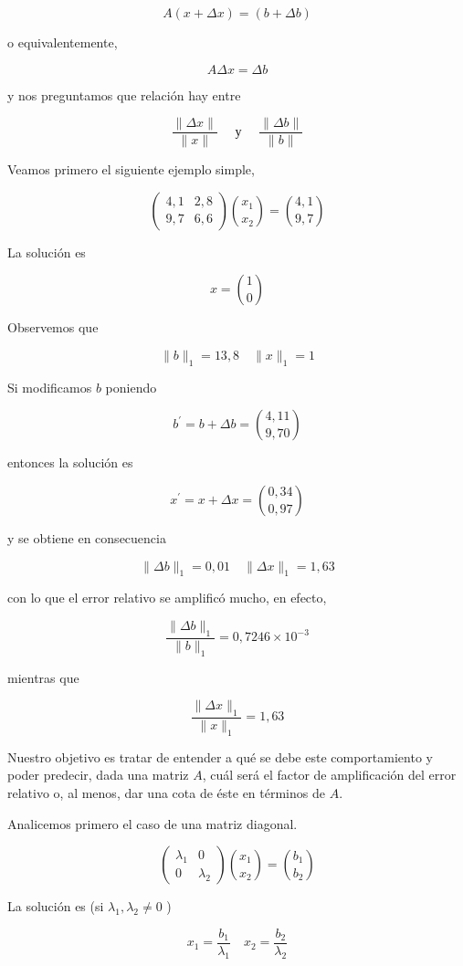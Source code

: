 \documentclass[10pt]{book}
\begin{document}
$$
A(x+\Delta x)=(b+\Delta b)
$$

o equivalentemente,

$$
A \Delta x=\Delta b
$$

y nos preguntamos que relación hay entre

$$
\frac{\|\Delta x\|}{\|x\|} \quad \text { у } \quad \frac{\|\Delta b\|}{\|b\|}
$$

Veamos primero el siguiente ejemplo simple,

$$
\left(\begin{array}{cc}
4,1 & 2,8 \\
9,7 & 6,6
\end{array}\right)\binom{x_{1}}{x_{2}}=\binom{4,1}{9,7}
$$

La solución es

$$
x=\binom{1}{0}
$$

Observemos que

$$
\|b\|_{1}=13,8 \quad\|x\|_{1}=1
$$

Si modificamos $b$ poniendo

$$
b^{\prime}=b+\Delta b=\binom{4,11}{9,70}
$$

entonces la solución es

$$
x^{\prime}=x+\Delta x=\binom{0,34}{0,97}
$$

y se obtiene en consecuencia

$$
\|\Delta b\|_{1}=0,01 \quad\|\Delta x\|_{1}=1,63
$$

con lo que el error relativo se amplificó mucho, en efecto,

$$
\frac{\|\Delta b\|_{1}}{\|b\|_{1}}=0,7246 \times 10^{-3}
$$

mientras que

$$
\frac{\|\Delta x\|_{1}}{\|x\|_{1}}=1,63
$$

Nuestro objetivo es tratar de entender a qué se debe este comportamiento y poder predecir, dada una matriz $A$, cuál será el factor de amplificación del error relativo o, al menos, dar una cota de éste en términos de $A$.

Analicemos primero el caso de una matriz diagonal.

$$
\left(\begin{array}{cc}
\lambda_{1} & 0 \\
0 & \lambda_{2}
\end{array}\right)\binom{x_{1}}{x_{2}}=\binom{b_{1}}{b_{2}}
$$

La solución es (si $\lambda_{1}, \lambda_{2} \neq 0$ )

$$
x_{1}=\frac{b_{1}}{\lambda_{1}} \quad x_{2}=\frac{b_{2}}{\lambda_{2}}
$$
\end{document}

